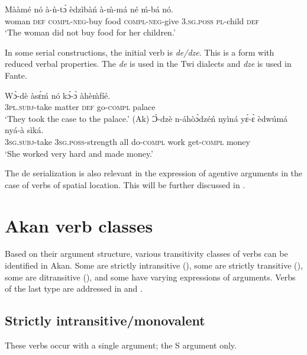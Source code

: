 \documentclass[output=paper]{langsci/langscibook}
\begin{document}
\ea
\label{ex:20.osam}
\gll Mààmé  nó  à-ǹ-tɔ́      èdzìbàń  à-\`{m}-má  né    ḿ-bá    nó. \\
     woman  \textsc{def}  \textsc{compl}-\textsc{neg}-buy  food    \textsc{compl}-\textsc{neg}-give \textsc{3.sg.poss}  \textsc{pl}-child  \textsc{def}\\
\glt `The woman did not buy food for her children.'
\z

In some serial constructions, the initial verb is \textit{de/dze}. This is a form with reduced verbal properties. The \textit{de} is used in the Twi dialects and \textit{dze} is used in Fante. 

\ea\label{ex:21.osam}
\ea\label{ex:21a.osam}
\gll Wɔ̀-dè    àsɛ́ḿ  nó  kɔ́-ɔ̀    àhè\`{m}fíé.\\
       \textsc{3pl.subj}-take  matter  \textsc{def}  go-\textsc{compl}  palace\\
\glt   `They took the case to the palace.' (Ak)
\ex\label{ex:21b.osam}
\gll   Ɔ̀-dzè    n-áhòɔ̀dzéń    nyìná  yɛ́-ɛ̀      èdwúmá nyá-à    sìká.\\
       \textsc{3sg.subj}-take  \textsc{3sg.poss}-strength  all  do-\textsc{compl}  work get-\textsc{compl}  money\\
\glt   `She worked very hard and made money.'
\z 
\z 


The de serialization is also relevant in the expression of agentive arguments in the case of verbs of spatial location. This will be further discussed in .

\section{Akan verb classes}\label{§3:akan.osam}

Based on their argument structure, various transitivity classes of verbs can be identified in Akan. Some are strictly intransitive (), some are strictly transitive (), some are ditransitive (), and some have varying expressions of arguments. Verbs of the last type are addressed in  and .

\subsection{Strictly intransitive/monovalent}\label{§3.1:strictly.osam}

These verbs occur with a single argument; the S argument only.
\end{document}

